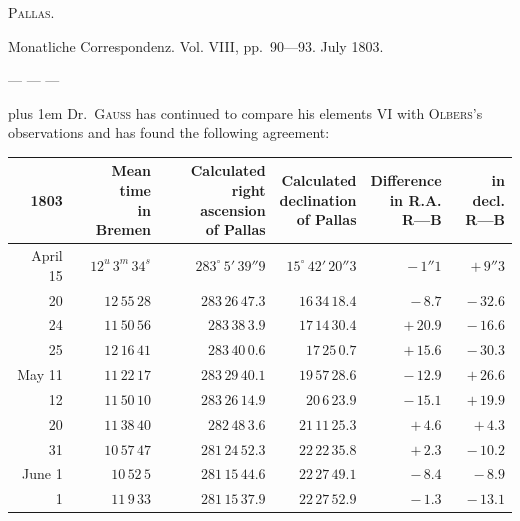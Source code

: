%
\begin{center}\textsc{Pallas.}\end{center}

\medskip
Monatliche Correspondenz. Vol. VIII, pp.\ 90—93. July 1803.

\medskip
— — —

\medskip
{\rightskip=0pt plus 1em
Dr.\ \textsc{Gauss} has continued to compare his elements VI with \textsc{Olbers}’s observations and has found the following agreement:\par}


\begin{center}
\begingroup\fontsize{9}{11}\selectfont\setlength{\tabcolsep}{3pt}\renewcommand{\arraystretch}{1.12}
\begin{tabular}{r|r|r|r|r|r}
1803 & \shortstack{Mean time\\in\\Bremen} & \shortstack{Calculated\\right ascension\\of Pallas} & \shortstack{Calculated\\declination\\of Pallas} & \shortstack{Difference\\in R.A.\\R—B} & \shortstack{in decl.\\R—B} \\ \hline
April 15 & $12^u\,3^m\,34^s$ & $283^\circ\,5'\,39''9$ & $15^\circ\,42'\,20''3$ & $-\,1''1$ & $+\,9''3$ \\
20 & $12\,55\,28$ & $283\,26\,47.3$ & $16\,34\,18.4$ & $-\,8.7$ & $-\,32.6$ \\
24 & $11\,50\,56$ & $283\,38\,3.9$ & $17\,14\,30.4$ & $+\,20.9$ & $-\,16.6$ \\
25 & $12\,16\,41$ & $283\,40\,0.6$ & $17\,25\,0.7$ & $+\,15.6$ & $-\,30.3$ \\
May 11 & $11\,22\,17$ & $283\,29\,40.1$ & $19\,57\,28.6$ & $-\,12.9$ & $+\,26.6$ \\
12 & $11\,50\,10$ & $283\,26\,14.9$ & $20\,6\,23.9$ & $-\,15.1$ & $+\,19.9$ \\
20 & $11\,38\,40$ & $282\,48\,3.6$ & $21\,11\,25.3$ & $+\,4.6$ & $+\,4.3$ \\
31 & $10\,57\,47$ & $281\,24\,52.3$ & $22\,22\,35.8$ & $+\,2.3$ & $-\,10.2$ \\
June 1 & $10\,52\,5$ & $281\,15\,44.6$ & $22\,27\,49.1$ & $-\,8.4$ & $-\,8.9$ \\
1 & $11\,9\,33$ & $281\,15\,37.9$ & $22\,27\,52.9$ & $-\,1.3$ & $-\,13.1$ \\
\end{tabular}\endgroup
\end{center}

\begin{flushright}
\end{flushright}

\bigskip
